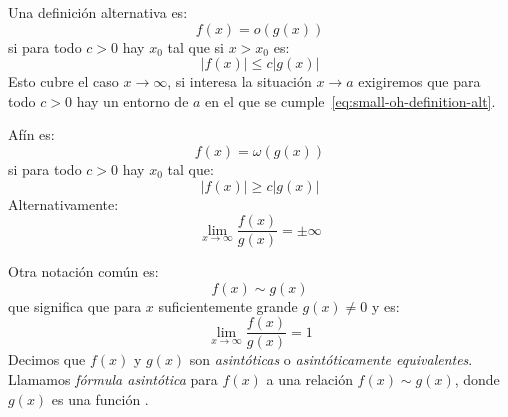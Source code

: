   Una definición alternativa es:
  \begin{equation}
    \label{eq:small-oh}
    f(x)
      = o(g(x))
  \end{equation}
  si para todo \(c > 0\) hay \(x_0\) tal que si \(x > x_0\)
  es:
  \begin{equation}
    \label{eq:small-oh-definition-alt}
    \lvert f(x) \rvert \le c \lvert g(x) \rvert
  \end{equation}
  Esto cubre el caso \(x \to \infty\),
  si interesa la situación \(x \to a\)
  exigiremos que para todo \(c > 0\)
  hay un entorno de \(a\)
  en el que se cumple~\eqref{eq:small-oh-definition-alt}.

  Afín es:
  \begin{equation}
    \label{eq:small-omega}
    f(x)
      = \omega(g(x))
  \end{equation}
  si para todo \(c > 0\) hay \(x_0\) tal que:
  \begin{equation}
    \label{eq:small-omega-definition}
    \lvert f(x) \rvert
      \ge c \lvert g(x) \rvert
  \end{equation}
  Alternativamente:
  \begin{equation}
    \label{eq:small-omega-definition-alt}
    \lim_{x \to \infty} \frac{f(x)}{g(x)}
      = \pm\infty
  \end{equation}

  Otra notación común es:
  \begin{equation*}
    f(x)
      \sim g(x)
  \end{equation*}
  que significa que para \(x\) suficientemente grande \(g(x) \ne 0\)
  y es:
  \begin{equation*}
    \lim_{x \to \infty} \frac{f(x)}{g(x)}
      = 1
  \end{equation*}
  Decimos que \(f(x)\) y \(g(x)\) son \emph{asintóticas}
  o \emph{asintóticamente equivalentes}.
  Llamamos \emph{fórmula asintótica} para \(f(x)\)
  a una relación \(f(x) \sim g(x)\), donde \(g(x)\)
  es una función .

